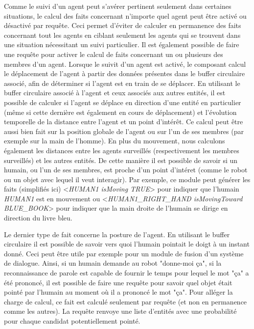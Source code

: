 \documentclass[a4paper,11pt,twoside]{StyleThese}
\begin{document}
Comme le suivi d'un agent peut s'avérer pertinent seulement dans certaines situations, le calcul des faits concernant n'importe quel agent peut être activé ou désactivé par requête. Ceci permet d'éviter de calculer en permanence des faits concernant tout les agents en ciblant seulement les agents qui se trouvent dans une situation nécessitant un suivi particulier.
Il est également possible de faire une requête pour activer le calcul de faits concernant un ou plusieurs des membres d'un agent. Lorsque le suivit d'un agent est activé, le composant calcul le déplacement de l'agent à partir des données présentes dans le buffer circulaire associé, afin de déterminer si l'agent est en train de se déplacer. En utilisant le buffer circulaire associé à l'agent et ceux associés aux autres entités, il est possible de calculer si l'agent se déplace en direction d'une entité en particulier (même si cette dernière est également en cours de déplacement) et l'évolution temporelle de la distance entre l'agent et un point d'intérêt. Ce calcul peut être aussi bien fait sur la position globale de l'agent ou sur l'un de ses membres (par exemple sur la main de l'homme).
En plus du mouvement, nous calculons également les distances entre les agents surveillés (respectivement les membres surveillés) et les autres entités.
De cette manière il est possible de savoir si un humain, ou l'un de ses membres, est proche d'un point d'intéret (comme le robot ou un objet avec lequel il veut interagir).
Par exemple, ce module peut générer les faits (simplifiés ici) <\textit{HUMAN1 isMoving TRUE}> pour indiquer que l'humain \textit{HUMAN1} est en mouvement ou <\textit{HUMAN1\_RIGHT\_HAND isMovingToward BLUE\_BOOK}> pour indiquer que la main droite de l'humain se dirige en direction du livre bleu.

Le dernier type de fait concerne la posture de l'agent. En utilisant le buffer circulaire il est possible de savoir vers quoi l'humain pointait le doigt à un instant donné. Ceci peut être utile par exemple pour un module de fusion d'un système de dialogue. Ainsi, si un humain demande au robot "donne-moi ça", si la reconnaissance de parole est capable de fournir le temps pour lequel le mot "ça" a été prononcé, il est possible de faire une requête pour savoir quel objet était pointé par l'humain au moment où il a prononcé le mot "ça". Pour alléger la charge de calcul, ce fait est calculé seulement par requête (et non en permanence comme les autres). La requête renvoye une liste d'entités avec une probabilité pour chaque candidat potentiellement pointé.
\end{document}
